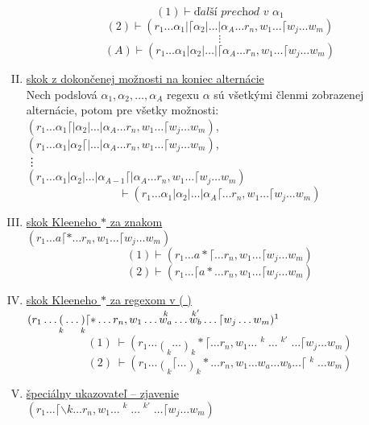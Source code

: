 \documentclass{svk_long_sk}
\begin{document}
\begin{definition}
\begin{enumerate}[I.]
$$(1) \vdash \textit{ďalší prechod v }\alpha_1$$
$$(2) \vdash (r_1 \dots \alpha_1 | \lceil \alpha_2 | \dots | \alpha_A \dots r_n, w_1\dots \lceil w_j \dots w_m)$$
$$\vdots$$
$$(A) \vdash (r_1 \dots \alpha_1 | \alpha_2 | \dots | \lceil \alpha_A \dots r_n, w_1\dots \lceil w_j \dots w_m)$$
\item \underline{skok z dokončenej možnosti na koniec alternácie}
\\ Nech podslová $\alpha_1, \alpha_2,\dots,\alpha_A$ regexu $\alpha$ sú všetkými členmi zobrazenej alternácie, potom pre všetky možnosti:
\\ $(r_1 \dots \alpha_1 \lceil | \alpha_2 | \dots | \alpha_A \dots r_n, w_1\dots \lceil w_j \dots w_m)$,
\\ $(r_1 \dots \alpha_1 | \alpha_2 \lceil | \dots | \alpha_A \dots r_n, w_1\dots \lceil w_j \dots w_m)$,
\\ \vdots \\ $(r_1 \dots \alpha_1 | \alpha_2 | \dots | \alpha_{A-1} \lceil | \alpha_A \dots r_n, w_1\dots \lceil w_j \dots w_m)$
$$\vdash (r_1 \dots \alpha_1 | \alpha_2 | \dots | \alpha_A \lceil \dots r_n, w_1\dots \lceil w_j \dots w_m)$$
\item \underline{skok Kleeneho $*$ za znakom}
\\ $(r_1\dots a\lceil *\dots r_n, w_1\dots\lceil w_j\dots w_m)$
$$(1) \vdash (r_1\dots a *\lceil\dots r_n, w_1\dots\lceil w_j\dots w_m)$$
$$(2) \vdash (r_1\dots \lceil a *\dots r_n, w_1\dots\lceil w_j\dots w_m)$$
\item \underline{skok Kleeneho $*$ za regexom v ( )}
\\ $\displaystyle{(r_1 \dots \mathop{(}_k \dots \mathop{)}_k\lceil * \dots r_n, w_1 \dots \mathop{w_a}^k \dots \mathop{w_b}^{k'} \dots \lceil w_j \dots w_m)\footnotemark}$
$$(1) ~\vdash(r_1 \dots \mathop{(}_k \dots \mathop{)}_k *\lceil \dots r_n, w_1 \dots \mathop{w_a}^k \dots \mathop{w_b}^{k'} \dots \lceil w_j \dots w_m)$$
$$(2) ~\vdash(r_1 \dots \mathop{(}_k\lceil \dots \mathop{)}_k * \dots r_n, w_1 \dots w_a \dots w_b \dots \lceil \mathop{w_j}^k \dots w_m)$$
\item \underline{špeciálny ukazovateľ -- zjavenie}
\\ $\displaystyle{(r_1 \dots \lceil \backslash k \dots r_n,w_1\dots\mathop{w_a}^k\dots\mathop{w_b}^{k'}\dots \lceil w_j\dots w_m)}$

\end{enumerate}
\end{definition}
\end{document}
